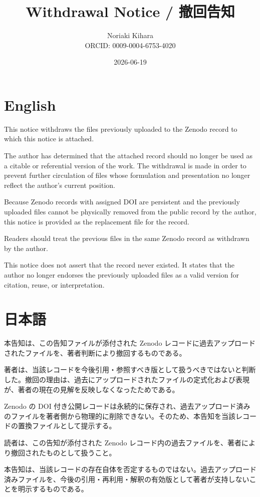 \documentclass[a4paper,11pt]{ltjsarticle}
\title{Withdrawal Notice / 撤回告知}
\author{Noriaki Kihara\\ORCID: 0009-0004-6753-4020}
\date{2026-06-19}
\begin{document}
\maketitle

\section*{English}

This notice withdraws the files previously uploaded to the Zenodo record to which this notice is attached.

The author has determined that the attached record should no longer be used as a citable or referential version of the work. The withdrawal is made in order to prevent further circulation of files whose formulation and presentation no longer reflect the author's current position.

Because Zenodo records with assigned DOI are persistent and the previously uploaded files cannot be physically removed from the public record by the author, this notice is provided as the replacement file for the record.

Readers should treat the previous files in the same Zenodo record as withdrawn by the author.

This notice does not assert that the record never existed. It states that the author no longer endorses the previously uploaded files as a valid version for citation, reuse, or interpretation.

\section*{日本語}

本告知は、この告知ファイルが添付された Zenodo レコードに過去アップロードされたファイルを、著者判断により撤回するものである。

著者は、当該レコードを今後引用・参照すべき版として扱うべきではないと判断した。撤回の理由は、過去にアップロードされたファイルの定式化および表現が、著者の現在の見解を反映しなくなったためである。

Zenodo の DOI 付き公開レコードは永続的に保存され、過去アップロード済みのファイルを著者側から物理的に削除できない。そのため、本告知を当該レコードの置換ファイルとして提示する。

読者は、この告知が添付された Zenodo レコード内の過去ファイルを、著者により撤回されたものとして扱うこと。

本告知は、当該レコードの存在自体を否定するものではない。過去アップロード済みファイルを、今後の引用・再利用・解釈の有効版として著者が支持しないことを明示するものである。
\end{document}
